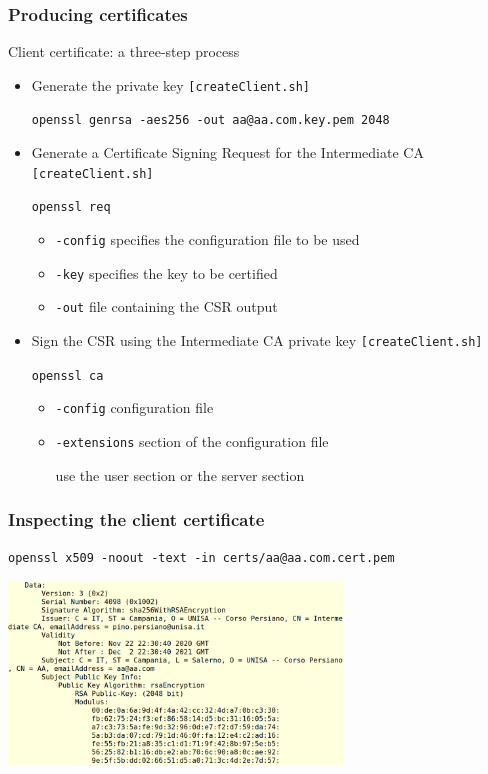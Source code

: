 \documentclass[]{beamer}
\begin{document}
\begin{frame}
\frametitle{Producing certificates}
\begin{block}{Client certificate: a three-step process}
\begin{itemize}
\item Generate the private key {\tt [createClient.sh]}

    {\color{brown} \tt openssl genrsa -aes256 -out aa@aa.com.key.pem 2048}

\item Generate a Certificate Signing Request for the Intermediate CA
{\tt [createClient.sh]}

    {\color{brown} \tt openssl req}

    \begin{itemize}
        \item {\tt -config} specifies the configuration file to be used
        \item {\tt -key} specifies the key to be certified
        \item {\tt -out} file containing the CSR output
    \end{itemize}

\item Sign the CSR using the Intermediate CA private key 
{\tt [createClient.sh]}

    {\color{brown} \tt openssl ca}
    \begin{itemize}
        \item {\tt -config} configuration file 
        \item {\tt -extensions} section of the configuration file
            
            use the  user section or the server section 
    \end{itemize}

\end{itemize}
\end{block}
\end{frame}

\begin{frame}
\frametitle{Inspecting the client certificate}

\centerline{\color{magenta} \tt openssl x509 -noout -text -in certs/aa@aa.com.cert.pem}

\begin{center}
\includegraphics[width=3.5in]{imgs/clientCert.png}
\end{center}
\end{frame}
\end{document}
